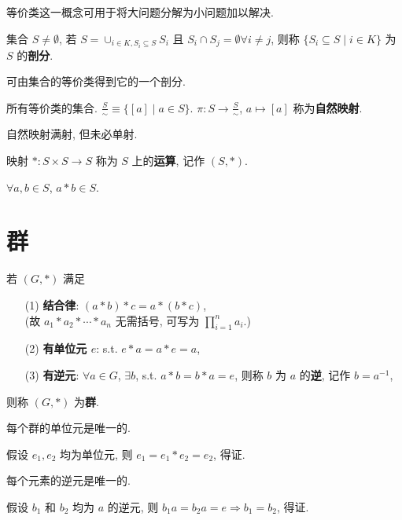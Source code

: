 \documentclass{note}
\begin{document}
等价类这一概念可用于将大问题分解为小问题加以解决.

\begin{df}[剖分]
    集合 $S\neq\emptyset$, 若 $S=\cup_{i\in K,S_i\subseteq S}S_i$ 且 $S_i\cap S_j=\emptyset\forall i\neq j$, 则称 $\{S_i\subseteq S\mid i\in K\}$ 为 $S$ 的\textbf{剖分}.
\end{df}

可由集合的等价类得到它的一个剖分.

\begin{df}[商类]
    所有等价类的集合. $\frac{S}{\sim}\equiv\{[a]\mid a\in S\}$. $\pi: S\rightarrow\frac{S}{\sim}$, $a\mapsto[a]$ 称为\textbf{自然映射}.
\end{df}

自然映射满射, 但未必单射.

\begin{df}[运算]
    映射 $*:S\times S\rightarrow S$ 称为 $S$ 上的\textbf{运算}, 记作 $(S,*)$.
\end{df}

$\forall a,b\in S$, $a*b\in S$.

\section{群}
\begin{df}[群]
    若 $(G,*)$ 满足
    \begin{itemize}
        \item[(1)] \textbf{结合律}: $(a*b)*c=a*(b*c)$,\\
        (故 $a_1*a_2*\cdots*a_n$ 无需括号, 可写为 $\prod_{i=1}^na_i$.)
        \item[(2)] \textbf{有单位元 $e$}: s.t. $e*a=a*e=a$,
        \item[(3)] \textbf{有逆元}: $\forall a\in G$, $\exists b$, s.t. $a*b=b*a=e$, 则称 $b$ 为 $a$ 的\textbf{逆}, 记作 $b=a^{-1}$,
    \end{itemize}
    则称 $(G,*)$ 为\textbf{群}.
\end{df}

\begin{thm}
    每个群的单位元是唯一的.
\end{thm}
\begin{pf}
    假设 $e_1,e_2$ 均为单位元, 则 $e_1=e_1*e_2=e_2$, 得证.
\end{pf}

\begin{thm}
    每个元素的逆元是唯一的.
\end{thm}
\begin{pf}
    假设 $b_1$ 和 $b_2$ 均为 $a$ 的逆元, 则 $b_1a=b_2a=e\Longrightarrow b_1=b_2$, 得证.
\end{pf}
\end{document}
